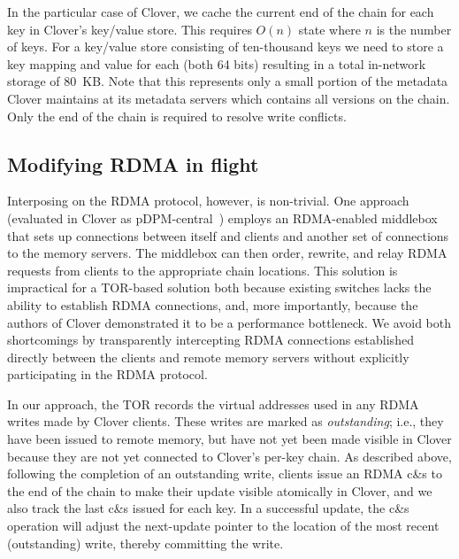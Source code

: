 

In the particular case of Clover, we cache the current end of the
chain for each key in Clover's key/value store. This requires $O(n)$
state where $n$ is the number of keys. For a key/value store
consisting of ten-thousand keys we need to store a key mapping and
value for each (both 64 bits) resulting in a total in-network storage
of 80~KB.  Note that this represents only a small portion of the
metadata Clover maintains at its metadata servers which contains all
versions on the chain. Only the end of the chain is required to
resolve write conflicts.


\subsection{Modifying RDMA in flight}

Interposing on the RDMA protocol, however, is non-trivial. One approach
(evaluated in Clover as pDPM-central~\cite{clover}) employs an RDMA-enabled
middlebox that sets up connections between itself and clients and another set
of connections to the memory servers. The middlebox can then order, rewrite,
and relay RDMA requests from clients to the appropriate chain locations. This
solution is impractical for a TOR-based solution both because existing
switches lacks the ability to establish RDMA connections, and, more
importantly, because the authors of Clover demonstrated it to be a
performance bottleneck. We avoid both shortcomings by transparently
intercepting RDMA connections established directly between the clients and
remote memory servers without explicitly participating in the RDMA protocol.

In our approach, the TOR records the virtual addresses used in any
RDMA writes made by Clover clients. These writes are marked as
\textit{outstanding}; i.e., they have been issued to remote memory,
but have not yet been made visible in Clover because they are not yet
connected to Clover's per-key chain.  As described above, following
the completion of an outstanding write, clients issue an RDMA c\&s to
the end of the chain to make their update visible atomically in
Clover, and we also track the last c\&s issued for each key.  In a
successful update, the c\&s operation will adjust the next-update
pointer to the location of the most recent (outstanding) write,
thereby committing the write.

